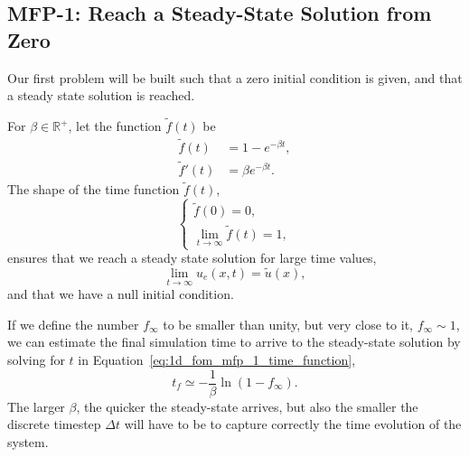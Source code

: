 \documentclass[../../main.tex]{subfiles}
\begin{document}

\subsection{MFP-1: Reach a Steady-State Solution from Zero}
Our first problem will be built such that a zero initial condition is given, and that a steady state solution is reached. 

For $\beta \in \mathbb{R}^{+}$, let the function $\tilde{f}(t)$ be
\begin{subequations}
    \begin{align}
        \tilde{f}(t) &= 1 - e^{-\beta t}, \label{eq:1d_fom_mfp_1_time_function}\\
        \tilde{f}'(t) &= \beta e^{-\beta t}.
    \end{align}
\end{subequations}
The shape of the time function $\tilde{f}(t)$,
\begin{equation*}
    \begin{cases}
    \tilde{f}(0) = 0, \\ 
    \lim_{t \rightarrow \infty} \tilde{f}(t) = 1,
    \end{cases}
\end{equation*}
ensures that we reach a steady state solution for large time values,
\begin{equation}
    \lim_{t\rightarrow \infty} u_e(x,t) = \tilde{u}(x),
\end{equation}
and that we have a null initial condition.

If we define the number $f_\infty$ to be smaller than unity, but very close to it, $f_\infty \sim 1$, we can estimate the final simulation time to arrive to the steady-state solution by solving for $t$ in Equation~\eqref{eq:1d_fom_mfp_1_time_function},
\begin{equation}
    t_f \simeq - \frac{1}{\beta} \ln(1 - f_\infty).
\end{equation}
The larger $\beta$, the quicker the steady-state arrives, but also the smaller the discrete timestep $\Delta t$ will have to be to capture correctly the time evolution of the system.
\end{document}
